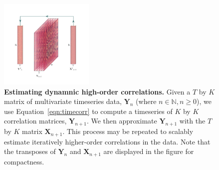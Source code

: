 \documentclass[english]{article}
\begin{document}
\begin{figure}
  \centering
  \includegraphics[width=0.4\textwidth]{figs/methods_fig}
  \caption{\textbf{Estimating dynamnic high-order correlations.}  Given
    a $T$ by $K$ matrix of multivariate timeseries data,
    $\mathbf{Y}_n$ (where $n \in \mathbb{N}, n \geq 0$), we use
    Equation~\ref{eqn:timecorr} to compute a timeseries of
    $K$ by $K$ correlation matrices, $\mathbf{Y}_{n+1}$.  We then
    approximate $\mathbf{Y}_{n+1}$ with the $T$ by $K$ matrix
    $\mathbf{X}_{n+1}$.  This process may be repeated to scalably estimate
    iteratively higher-order correlations in the data.  Note that the
    transposes of $\mathbf{Y}_n$ and $\mathbf{X}_{n+1}$ are displayed
    in the figure for compactness.
  \label{fig:methods}}
\end{figure}
\end{document}
